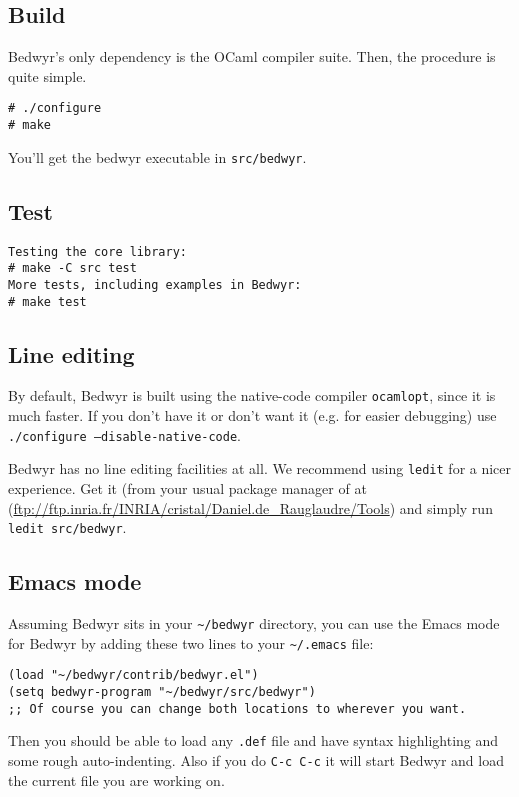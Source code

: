 \documentclass{article}
\begin{document}
\subsection{Build}

Bedwyr's only dependency is the OCaml compiler suite.
Then, the procedure is quite simple.

\begin{verbatim}
# ./configure
# make
\end{verbatim}

You'll get the bedwyr executable in \texttt{src/bedwyr}.

\subsection{Test}

\begin{verbatim}
Testing the core library:
# make -C src test
More tests, including examples in Bedwyr:
# make test
\end{verbatim}

\subsection{Line editing}

By default, Bedwyr is built using the native-code compiler \texttt{ocamlopt},
since it is much faster. If you don't have it or don't want it (e.g.
for easier debugging) use \texttt{./configure --disable-native-code}.

Bedwyr has no line editing facilities at all. We recommend using \texttt{ledit}
for a nicer experience. Get it (from your usual package manager of at
(\url{ftp://ftp.inria.fr/INRIA/cristal/Daniel.de_Rauglaudre/Tools})
and simply run \texttt{ledit src/bedwyr}.

\subsection{Emacs mode}

Assuming Bedwyr sits in your \verb.~/bedwyr. directory,
you can use the Emacs mode for Bedwyr by adding these two lines to your
\verb,~/.emacs, file:
\begin{verbatim}
(load "~/bedwyr/contrib/bedwyr.el")
(setq bedwyr-program "~/bedwyr/src/bedwyr")
;; Of course you can change both locations to wherever you want.
\end{verbatim}

Then you should be able to load any \verb:.def: file
and have syntax highlighting and some rough auto-indenting.
Also if you do \verb.C-c C-c. it will start Bedwyr
and load the current file you are working on.
\end{document}
